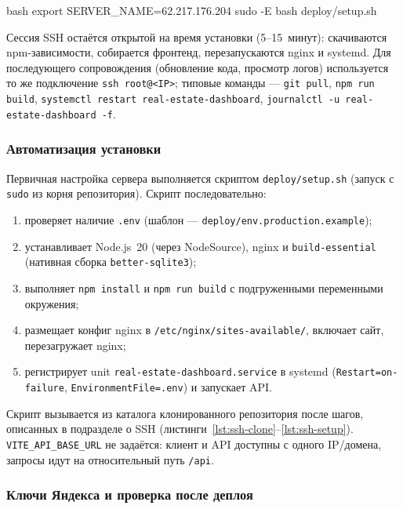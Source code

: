 \begin{singleminted}{bash}
export SERVER_NAME=62.217.176.204
sudo -E bash deploy/setup.sh
\end{singleminted}
\label{lst:ssh-setup}

Сессия SSH остаётся открытой на время установки (5--15~минут): скачиваются npm-зависимости, собирается фронтенд, перезапускаются nginx и systemd. Для последующего сопровождения (обновление кода, просмотр логов) используется то же подключение \texttt{ssh root@<IP>}; типовые команды --- \texttt{git pull}, \texttt{npm run build}, \texttt{systemctl restart real-estate-dashboard}, \texttt{journalctl -u real-estate-dashboard -f}.

\subsubsection{Автоматизация установки}

Первичная настройка сервера выполняется скриптом \texttt{deploy/setup.sh} (запуск с \texttt{sudo} из корня репозитория). Скрипт последовательно:
\begin{enumerate}
    \item проверяет наличие \texttt{.env} (шаблон --- \texttt{deploy/env.production.example});
    \item устанавливает Node.js~20 (через NodeSource), nginx и \texttt{build-essential} (нативная сборка \texttt{better-sqlite3});
    \item выполняет \texttt{npm install} и \texttt{npm run build} с подгруженными переменными окружения;
    \item размещает конфиг nginx в \texttt{/etc/nginx/sites-available/}, включает сайт, перезагружает nginx;
    \item регистрирует unit \texttt{real-estate-dashboard.service} в systemd (\texttt{Restart=on-failure}, \texttt{EnvironmentFile=.env}) и запускает API.
\end{enumerate}

Скрипт вызывается из каталога клонированного репозитория после шагов, описанных в подразделе о SSH (листинги~\ref{lst:ssh-clone}--\ref{lst:ssh-setup}). \texttt{VITE\_API\_BASE\_URL} не задаётся: клиент и API доступны с одного IP/домена, запросы идут на относительный путь \texttt{/api}.

\subsubsection{Ключи Яндекса и проверка после деплоя}

